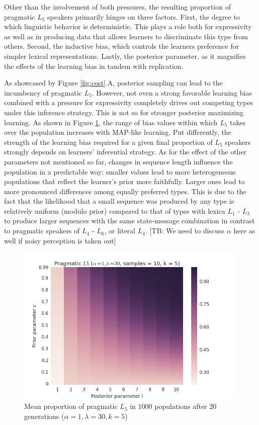 \documentclass[a4paper]{article}
\newcommand{\tb}[1]{\textcolor[rgb]{.8,.33,.0}{[TB: #1]}}%
\begin{document}
Other than the involvement of both pressures, the resulting proportion of pragmatic $L_5$ speakers primarily hinges on three factors. First, the degree to which linguistic behavior is deterministic. This plays a role both for expressivity as well as in producing data that allows learners to discriminate this type from others. Second, the inductive bias, which controls the learners preference for simpler lexical representations. Lastly, the posterior parameter, as it magnifies the effects of the learning bias in tandem with replication. 

As showcased by Figure \ref{fig:cost}.A, posterior sampling can lead to the incumbency of pragmatic $L_5$. However, not even a strong favorable learning bias combined with a pressure for expressivity completely drives out competing types under this inference strategy. This is not so for stronger posterior maximizing learning. As shown in Figure \ref{fig:prior-posterior}, the range of bias values within which $L_5$ takes over the population increases with MAP-like learning. Put differently, the strength of the learning bias required for a given final proportion of $L_5$ speakers strongly depends on learners' inferential strategy. As for the effect of the other parameters not mentioned so far, changes in sequence length influence the population in a predictable way: smaller values lead to more heterogeneous populations that reflect the learner's prior more faithfully. Larger ones lead to more pronounced differences among equally preferred types. This is due to the fact that the likelihood that a small sequence was produced by any type is relatively uniform (modulo prior) compared to that of types with lexica $L_1$ - $L_3$ to produce larger sequences with the same state-message combination in contrast to pragmatic speakers of $L_4$ - $L_6$, or literal $L_4$. \tb{We need to discuss $\alpha$ here as well if noisy perception is taken out}


\begin{figure}
\centering
\includegraphics[scale=.5]{../presentations/01heatmap}
\caption{Mean proportion of pragmatic $L_5$ in $1000$ populations after $20$ generations ($\alpha = 1, \lambda = 30, k = 5$)}
\label{fig:prior-posterior}
\end{figure}
\end{document}
